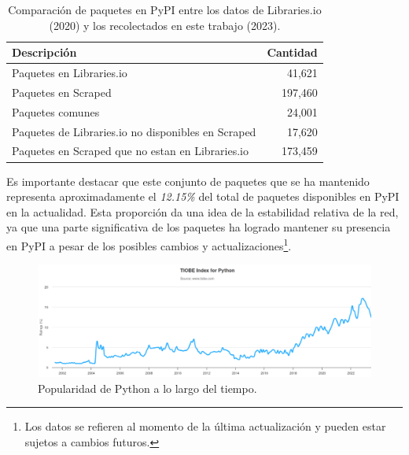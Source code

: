 \begin{table}[ht!]
    \begin{center}
        \begin{tabular}{|l|r|}
            \hline
            \textbf{Descripción}                               & \textbf{Cantidad} \\
            \hline
            Paquetes en Libraries.io                           & 41,621            \\
            Paquetes en Scraped                                & 197,460           \\
            Paquetes comunes                                   & 24,001            \\
            Paquetes de Libraries.io no disponibles en Scraped & 17,620            \\
            Paquetes en Scraped que no estan en Libraries.io   & 173,459           \\
            \hline
        \end{tabular}
    \end{center}
    \label{tab:pypi_common_packages}
    \caption{Comparación de paquetes en PyPI entre los datos de Libraries.io (2020) y los recolectados en este trabajo (2023).}
\end{table}

Es importante destacar que este conjunto de paquetes que se ha mantenido representa aproximadamente
el \textit{12.15\%} del total de paquetes disponibles en PyPI en la actualidad. Esta proporción
da una idea de la estabilidad relativa de la red, ya que una parte significativa de los
paquetes ha logrado mantener su presencia en PyPI a pesar de los posibles cambios y
actualizaciones\footnote{Los datos se refieren al momento de la última actualización y pueden estar
    sujetos a cambios futuros.}.

\begin{figure}[ht!]
    \begin{center}
        \includegraphics[width=1\textwidth]{img/pypi/pypi_popularity.png}
        \caption{Popularidad de Python a lo largo del tiempo.}
        \label{fig:pypi_popularity}
    \end{center}
\end{figure}


